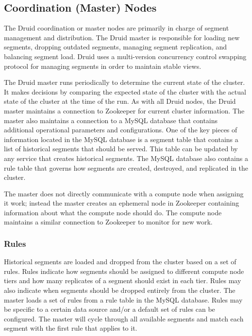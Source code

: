 \documentclass{vldb}
\begin{document}
\subsection{Coordination (Master) Nodes}
The Druid coordination or master nodes are primarily in charge of
segment management and distribution. The Druid master is responsible
for loading new segments, dropping outdated segments, managing segment
replication, and balancing segment load. Druid uses a multi-version
concurrency control swapping protocol for managing segments in order
to maintain stable views.

The Druid master runs periodically to determine the current state of
the cluster. It makes decisions by comparing the expected state of the
cluster with the actual state of the cluster at the time of the
run. As with all Druid nodes, the Druid master maintains a connection
to Zookeeper for current cluster information. The master also
maintains a connection to a MySQL database that contains additional
operational parameters and configurations. One of the key pieces of
information located in the MySQL database is a segment table that
contains a list of historical segments that should be served. This
table can be updated by any service that creates historical
segments. The MySQL database also contains a rule table that governs
how segments are created, destroyed, and replicated in the cluster.

The master does not directly communicate with a compute node when
assigning it work; instead the master creates an ephemeral node in
Zookeeper containing information about what the compute node should
do. The compute node maintains a similar connection to Zookeeper to
monitor for new work.

\subsubsection{Rules}
Historical segments are loaded and dropped from the cluster based on a
set of rules. Rules indicate how segments should be assigned to
different compute node tiers and how many replicates of a segment
should exist in each tier. Rules may also indicate when segments
should be dropped entirely from the cluster. The master loads a set of
rules from a rule table in the MySQL database. Rules may be specific
to a certain data source and/or a default set of rules can be
configured. The master will cycle through all available segments and
match each segment with the first rule that applies to it.
\end{document}

